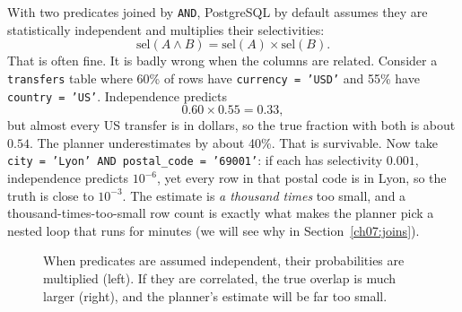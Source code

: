 With two predicates joined by \texttt{AND}, PostgreSQL by default assumes they are statistically independent and multiplies their selectivities:
\[
  \text{sel}(A \land B) = \text{sel}(A) \times \text{sel}(B).
\]
That is often fine. It is badly wrong when the columns are related. Consider a \texttt{transfers} table where 60\% of rows have \texttt{currency = 'USD'} and 55\% have \texttt{country = 'US'}. Independence predicts
\[
  0.60 \times 0.55 = 0.33,
\]
but almost every US transfer is in dollars, so the true fraction with both is about $0.54$. The planner underestimates by about 40\%. That is survivable. Now take \texttt{city = 'Lyon' AND postal\_code = '69001'}: if each has selectivity $0.001$, independence predicts $10^{-6}$, yet every row in that postal code is in Lyon, so the truth is close to $10^{-3}$. The estimate is \emph{a thousand times} too small, and a thousand-times-too-small row count is exactly what makes the planner pick a nested loop that runs for minutes (we will see why in Section~\ref{ch07:joins}).


\begin{figure}[H]
\centering
{}
\caption{When predicates are assumed independent, their probabilities are multiplied (left). If they are correlated, the true overlap is much larger (right), and the planner's estimate will be far too small.}
\label{ch07:fig-correlation}
\end{figure}

